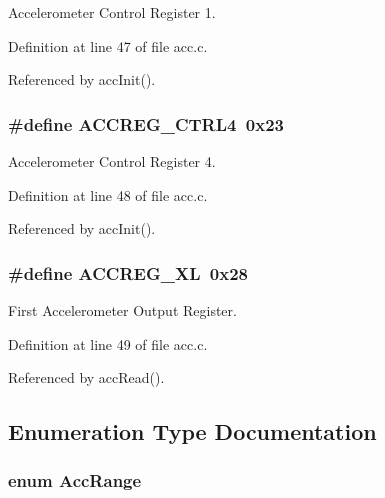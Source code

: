 Accelerometer Control Register 1. 



Definition at line 47 of file acc.\-c.



Referenced by acc\-Init().

\hypertarget{group__acc_ga4369b46f297623a18b9d937623b7f783}{
\subsubsection[{A\-C\-C\-R\-E\-G\-\_\-\-C\-T\-R\-L4}]{\setlength{\rightskip}{0pt plus 5cm}\#define A\-C\-C\-R\-E\-G\-\_\-\-C\-T\-R\-L4~0x23}}\label{group__acc_ga4369b46f297623a18b9d937623b7f783}


Accelerometer Control Register 4. 



Definition at line 48 of file acc.\-c.



Referenced by acc\-Init().

\hypertarget{group__acc_ga9d03f89f2f3ef006967f84157a21075b}{
\subsubsection[{A\-C\-C\-R\-E\-G\-\_\-\-X\-L}]{\setlength{\rightskip}{0pt plus 5cm}\#define A\-C\-C\-R\-E\-G\-\_\-\-X\-L~0x28}}\label{group__acc_ga9d03f89f2f3ef006967f84157a21075b}


First Accelerometer Output Register. 



Definition at line 49 of file acc.\-c.



Referenced by acc\-Read().



\subsection{Enumeration Type Documentation}
\hypertarget{group__acc_ga3d56e56c162b045de727006a11880324}{
\subsubsection[{Acc\-Range}]{\setlength{\rightskip}{0pt plus 5cm}enum {\bf Acc\-Range}}}\label{group__acc_ga3d56e56c162b045de727006a11880324}


